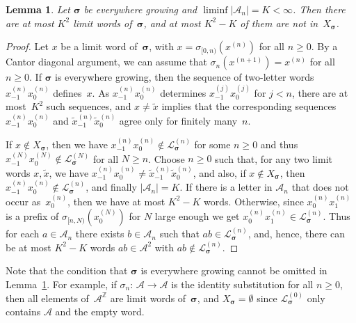\documentclass{amsart}
\newtheorem{lemma}{Lemma}[section]
\theoremstyle{definition}
\theoremstyle{remark}
\numberwithin{equation}{section}
\begin{document}
\begin{lemma} \label{l:limitwords}
Let $\boldsymbol{\sigma}$ be everywhere growing and $\liminf |\mathcal{A}_n| = K < \infty$. 
Then there are at most $K^2$ limit words of~$\boldsymbol{\sigma}$, and at most $K^2 - K$ of them are not in~$X_{\boldsymbol{\sigma}}$. 
\end{lemma}

\begin{proof}
Let $x$ be a limit word of~$\boldsymbol{\sigma}$, with $x = \sigma_{[0,n)}(x^{(n)})$ for all $n \ge 0$. 
By a Cantor diagonal argument, we can assume that $\sigma_n(x^{(n+1)}) = x^{(n)}$ for all $n \ge 0$. 
If $\boldsymbol{\sigma}$ is everywhere growing, then the sequence of two-letter words $x_{-1}^{(n)} x_0^{(n)}$  defines~$x$. 
As $x_{-1}^{(n)} x_0^{(n)}$ determines $x_{-1}^{(j)} x_0^{(j)}$ for $j<n$, there are at most~$K^2$ such sequences, and $x \ne \tilde{x}$ implies that the corresponding sequences $x_{-1}^{(n)} x_0^{(n)}$ and $\tilde{x}_{-1}^{(n)} \tilde{x}_0^{(n)}$ agree only for finitely many~$n$. 

If $x \notin X_{\boldsymbol{\sigma}}$, then we have $x_{-1}^{(n)} x_0^{(n)} \notin \mathcal{L}_{\boldsymbol{\sigma}}^{(n)}$ for some $n\ge0$ and thus $x_{-1}^{(N)} x_0^{(N)} \notin \mathcal{L}_{\boldsymbol{\sigma}}^{(N)}$ for all $N \ge n$. 
Choose $n \ge 0$ such that, for any two limit words $x, \tilde{x}$, we have $x_{-1}^{(n)} x_0^{(n)} \ne \tilde{x}_{-1}^{(n)} \tilde{x}_0^{(n)}$, and also, if $x \notin X_{\boldsymbol{\sigma}}$, then $x_{-1}^{(n)} x_0^{(n)} \notin \mathcal{L}_{\boldsymbol{\sigma}}^{(n)}$, and finally $|\mathcal{A}_n| = K$.
If there is a letter in $\mathcal{A}_n$ that does not occur as~$x_0^{(n)}$, then we have at most $K^2-K$ words. 
Otherwise, since $x_0^{(n)}x_1^{(n)}$ is a prefix of $\sigma_{[n,N)}(x_0^{(N)})$ for $N$ large enough we get $x_0^{(n)}x_1^{(n)}\in\mathcal{L}_{\boldsymbol{\sigma}}^{(n)}$. 
Thus for each $a \in \mathcal{A}_n$ there exists $b \in \mathcal{A}_n$ such that $ab \in \mathcal{L}_{\boldsymbol{\sigma}}^{(n)}$, and, 
hence, there can be at most $K^2-K$ words $ab\in\mathcal{A}^2$ with $ab \notin \mathcal{L}_{\boldsymbol{\sigma}}^{(n)}$.
\end{proof}

Note that the condition that $\boldsymbol{\sigma}$ is everywhere growing cannot be omitted in Lemma~\ref{l:limitwords}. 
For example, if $\sigma_n:\, \mathcal{A} \to \mathcal{A}$ is the identity substitution for all $n\ge0$, then all elements of~$\mathcal{A}^\mathbb{Z}$ are limit words of~$\boldsymbol{\sigma}$, and $X_{\boldsymbol{\sigma}} = \emptyset$ since $\mathcal{L}^{(0)}_{\boldsymbol{\sigma}}$ only contains $\mathcal{A}$ and the empty word.  
\end{document}
